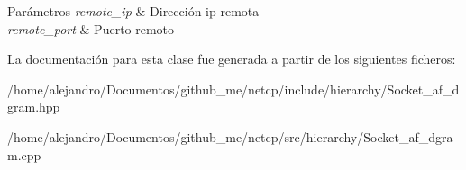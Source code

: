 \begin{DoxyParams}{Parámetros}
{\em remote\+\_\+ip} & Dirección ip remota \\
\hline
{\em remote\+\_\+port} & Puerto remoto \\
\hline
\end{DoxyParams}


La documentación para esta clase fue generada a partir de los siguientes ficheros\+:\begin{DoxyCompactItemize}
\item 
/home/alejandro/\+Documentos/github\+\_\+me/netcp/include/hierarchy/Socket\+\_\+af\+\_\+dgram.\+hpp\item 
/home/alejandro/\+Documentos/github\+\_\+me/netcp/src/hierarchy/Socket\+\_\+af\+\_\+dgram.\+cpp\end{DoxyCompactItemize}
